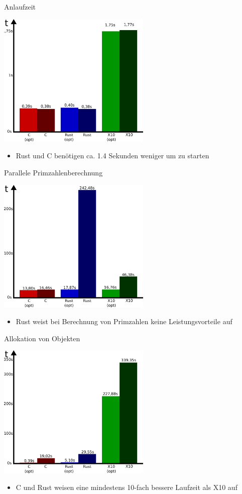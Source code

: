 \begin{frame}{Anlaufzeit}
  \begin{center}
    \includegraphics[width=0.55\textwidth]{images/startup-eval.pdf}
  \end{center}
  \begin{itemize}
    \item Rust und C benötigen ca. 1.4 Sekunden weniger um zu starten
  \end{itemize}
\end{frame}

\begin{frame}{Parallele Primzahlenberechnung}
  \begin{center}
    \includegraphics[width=0.55\textwidth]{images/primes-eval.pdf}
  \end{center}
  \begin{itemize}
    \item Rust weist bei Berechnung von Primzahlen keine Leistungsvorteile auf
  \end{itemize}
\end{frame}

\begin{frame}{Allokation von Objekten}
  \begin{center}
    \includegraphics[width=0.55\textwidth]{images/garbage-eval.pdf}
  \end{center}
  \begin{itemize}
    \item C und Rust weisen eine mindestens 10-fach bessere Laufzeit als X10 auf
  \end{itemize}
\end{frame}